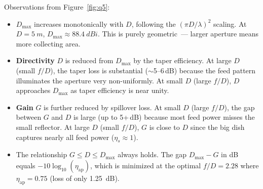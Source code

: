 \documentclass{article}
\begin{document}
Observations from Figure~\ref{fig:q5}:
\begin{itemize}
\item $D_{\max}$ increases monotonically with $D$, following the $(\pi D/\lambda)^2$ scaling. At $D=\SI{5}{m}$, $D_{\max} \approx \SI{88.4}{dBi}$. This is purely geometric~--- larger aperture means more collecting area.
\item \textbf{Directivity} $D$ is reduced from $D_{\max}$ by the taper efficiency. At large $D$ (small $f/D$), the taper loss is substantial (${\sim}$5--6\,dB) because the feed pattern illuminates the aperture very non-uniformly. At small $D$ (large $f/D$), $D$ approaches $D_{\max}$ as taper efficiency is near unity.
\item \textbf{Gain} $G$ is further reduced by spillover loss. At small $D$ (large $f/D$), the gap between $G$ and $D$ is large (up to 5+\,dB) because most feed power misses the small reflector. At large $D$ (small $f/D$), $G$ is close to $D$ since the big dish captures nearly all feed power ($\eta_s\approx 1$).
\item The relationship $G \leq D \leq D_{\max}$ always holds. The gap $D_{\max} - G$ in dB equals $-10\log_{10}(\eta_{\text{ap}})$, which is minimized at the optimal $f/D = 2.28$ where $\eta_{\text{ap}} = 0.75$ (loss of only \SI{1.25}{dB}).
\end{itemize}
\end{document}
